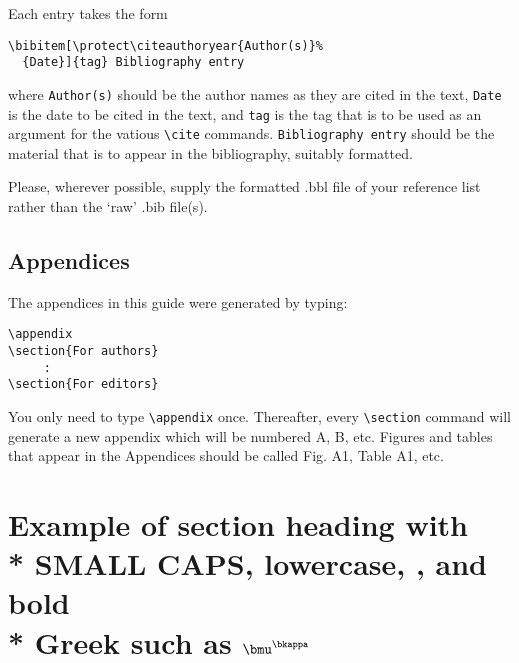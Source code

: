 \documentclass[useAMS,usenatbib]{mn2e}
\begin{document}
%
Each entry takes the form
%
\begin{verbatim}
\bibitem[\protect\citeauthoryear{Author(s)}%
  {Date}]{tag} Bibliography entry
\end{verbatim}
%
where \verb"Author(s)" should be the author names as they are
cited in the text, \verb"Date" is the date to be cited in the
text, and \verb"tag" is the tag that is to be used as an argument
for the vatious \verb"\cite" commands. \verb"Bibliography entry"
should be the material that is to appear in the bibliography,
suitably formatted.

Please, wherever possible, supply the formatted .bbl file of your
reference list rather than the `raw' .bib file(s).

\subsection{Appendices}

The appendices in this guide were generated by typing:
%
\begin{verbatim}
\appendix
\section{For authors}
     :
\section{For editors}
\end{verbatim}
%
You only need to type \verb"\appendix" once. Thereafter, every
\verb"\section" command will generate a new appendix which will be
numbered A, B, etc. Figures and tables that appear in the
Appendices should be called Fig. A1, Table A1, etc.


\section[]{Example of section heading with\\*
  S{\sevensize\bf MALL} C{\sevensize\bf APS},
  \lowercase{lowercase}, ,
  and bold\\* Greek such as
  $\bmu^{\bkappa}$}\label{headings}
\end{document}
